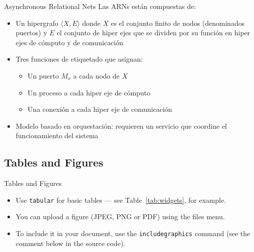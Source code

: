 \documentclass[10pt,xcolor={table,dvipsnames},t]{beamer}
\begin{document}
\begin{frame}{Asynchronous Relational Nets}
Las ARNs están compuestas de:
\begin{itemize}
    \item Un hipergrafo $\langle X,E \rangle$ donde $X$ es el conjunto finito de nodos (denominados puertos) y $E$ el conjunto de hiper ejes que se dividen por su función en hiper ejes de cómputo y de comunicación
    
    \item Tres funciones de etiquetado que asignan:
        \begin{itemize}
            \item Un puerto $M_x$ a cada nodo de $X$
            \item Un proceso a cada hiper eje de cómputo 
            \item Una conexión a cada hiper eje de comunicación
        \end{itemize}
    \item Modelo basado en orquestación: requieren un servicio que coordine el funcionamiento del sistema
\end{itemize}

\end{frame}


\subsection{Tables and Figures}



\begin{frame}{Tables and Figures}

\begin{itemize}
\item Use \texttt{tabular} for basic tables --- see Table~\ref{tab:widgets}, for example.
\item You can upload a figure (JPEG, PNG or PDF) using the files menu. 
\item To include it in your document, use the \texttt{includegraphics} command (see the comment below in the source code).
\end{itemize}

\end{frame}
\end{document}
